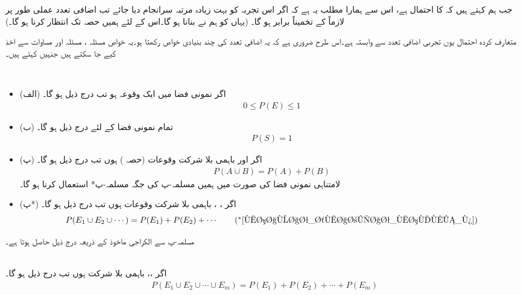 جب ہم کہتے ہیں کہ  کا احتمال  ہے، اس سے ہمارا مطلب یہ ہے کہ اگر اس تجربہ کو بہت زیادہ مرتبہ سرانجام دیا جائے تب اضافی تعدد   عملی طور پر لازماً  کے تخمیناً برابر ہو گا۔ (یہاں   کو ہم نے  بنانا ہو گا۔اس کے لئے ہمیں حصہ  تک  انتظار کرنا ہو گا۔)

متعارف کردہ احتمال یوں تجربی اضافی تعدد  سے وابستہ ہے۔اس طرح ضروری ہے کہ یہ اضافی تعدد کی چند بنیادی خواص رکھتا ہو۔یہ خواص مسئلہ ، مسئلہ  اور مساوات   سے اخذ کیے جا سکتے ہیں جنہیں  کہتے ہیں۔

\\
\begin{itemize}
\item{(الف)}
اگر نمونی فضا  میں  ایک وقوعہ ہو تب درج ذیل ہو گا۔
\begin{align}\label{مساوات_شماریات_مسلمہ_الف}
0\le P(E)\le 1
\end{align}
%
\item{(ب)}
تمام نمونی فضا کے لئے درج ذیل ہو گا۔
\begin{align}\label{مساوات_شماریات_مسلمہ_ب}
P(S)=1
\end{align}
%
\item{(پ)}
اگر   اور  باہمی بلا شرکت وقوعات (حصہ ) ہوں تب درج ذیل ہو گا۔
\begin{align}\label{مساوات_شماریات_مسلمہ_پ}
P(A\cup B)=P(A)+P(B)
\end{align}
%
لامتناہی نمونی فضا کی صورت میں ہمیں مسلمہ-پ کی جگہ مسلمہ-پ*  استعمال کرنا ہو گا۔
\item{(پ*)}
اگر ، ،  باہمی بلا شرکت وقوعات ہوں تب درج ذیل ہو گا۔
\begin{align*}
P(E_1\cup E_2 \cup\cdots)=P(E_1)+P(E_2)+\cdots  \tag{$^*$\ref{مساوات_شماریات_مسلمہ_پ}}
\end{align*}
\end{itemize}

مسلمہ-پ سے الکراجی ماخوذ کے ذریعہ درج ذیل حاصل ہوتا ہے۔

\quad {}\\
اگر ،،  باہمی بلا شرکت ہوں تب درج ذیل ہو گا۔
\begin{align}
P(E_1\cup E_2\cup \cdots \cup E_m)=P(E_1)+P(E_2)+\cdots+P(E_m)
\end{align}

